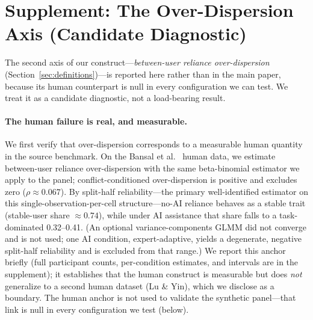 \documentclass[manuscript,review,anonymous]{acmart}
\begin{document}



\appendix

\section{Supplement: The Over-Dispersion Axis (Candidate Diagnostic)}
\label{app:overdispersion}

The second axis of our construct---\emph{between-user reliance over-dispersion}
(Section~\ref{sec:definitions})---is reported here rather than in the main paper, because its human
counterpart is null in every configuration we can test. We treat it as a candidate diagnostic, not a
load-bearing result.

\paragraph{The human failure is real, and measurable.} We first verify that over-dispersion corresponds to
a measurable human quantity in the source benchmark. On the
Bansal et al.~\cite{bansal2021whole} human data, we estimate between-user reliance over-dispersion with the
same beta-binomial estimator we apply to the panel; conflict-conditioned over-dispersion is positive and
excludes zero ($\rho \approx 0.067$). By split-half reliability---the primary well-identified estimator on
this single-observation-per-cell structure---no-AI reliance behaves as a stable trait (stable-user share
$\approx 0.74$), while under AI assistance that share falls to a task-dominated 0.32--0.41. (An optional
variance-components GLMM did not converge and is not used; one AI condition, expert-adaptive, yields a
degenerate, negative split-half reliability and is excluded from that range.) We report this anchor briefly (full
participant counts, per-condition estimates, and intervals are in the supplement); it establishes that the
human construct is measurable but does \emph{not} generalize to a second human dataset (Lu \& Yin), which we
disclose as a boundary. The human anchor is not used to validate the synthetic panel---that link is null in
every configuration we test (below).
\end{document}
